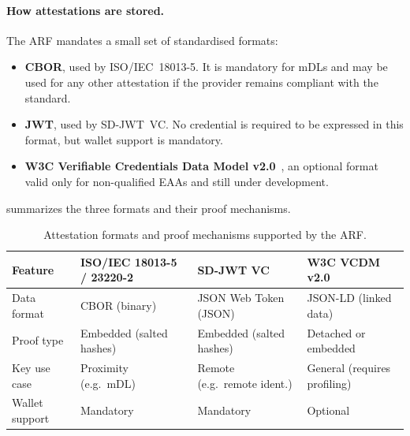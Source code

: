 \documentclass[binding=0.6cm,oneside,noexaminfo]{sapthesis}
\begin{document}
\paragraph{How attestations are stored.} The ARF mandates a small set of standardised formats:
\begin{itemize}[noitemsep]
  \item \textbf{CBOR}, used by ISO/IEC~18013-5. It is mandatory for mDLs and may be used for any other attestation if the
        provider remains compliant with the standard.
  \item \textbf{JWT}, used by SD-JWT~VC. No credential is required to be expressed in this format, but wallet support is
        mandatory.
  \item \textbf{W3C Verifiable Credentials Data Model v2.0}~\cite{w3cvcdm}, an optional format valid only for
        non-qualified EAAs and still under development.
\end{itemize}
 summarizes the three formats and their proof mechanisms.

\begin{table}[ht]
  \centering
  \caption{Attestation formats and proof mechanisms supported by the ARF.}
  \label{tab:formats}
  \small
  \begin{tabularx}{\textwidth}{@{}l L L L@{}}
    \toprule
    \textbf{Feature} & \textbf{ISO/IEC 18013-5 / 23220-2} & \textbf{SD-JWT VC} & \textbf{W3C VCDM v2.0} \\
    \midrule
    Data format    & CBOR (binary)            & JSON Web Token (JSON)        & JSON-LD (linked data) \\
    Proof type     & Embedded (salted hashes) & Embedded (salted hashes)     & Detached or embedded \\
    Key use case   & Proximity (e.g.\ mDL)    & Remote (e.g.\ remote ident.) & General (requires profiling) \\
    Wallet support & Mandatory                & Mandatory                    & Optional \\
    \bottomrule
  \end{tabularx}
\end{table}
\end{document}
